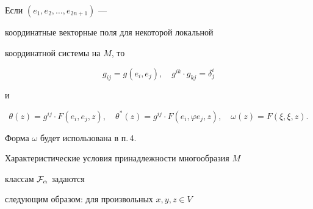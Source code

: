 Если $(e_1,e_2,\dotsc,e_{2n+1})$ ---


координатные векторные поля для некоторой локальной


координатной системы на $M$, то


$$


g_{ij}=g(e_i,e_j),\quad g^{ik}\cdot g_{kj}=\delta^i_j


$$


и


$$


\theta(z)=g^{ij}\cdot F(e_i,e_j,z),\quad


\theta^*(z)=g^{ij}\cdot F(e_i,\varphi e_j,z),\quad


\omega(z)=F(\xi,\xi,z).


$$





Форма $\omega$ будет использована в п.\,4.


 


Характеристические условия принадлежности многообразия $M$


классам $\cal F_\alpha$ задаются 


следующим образом: для произвольных $x,y,z\in V$ 


